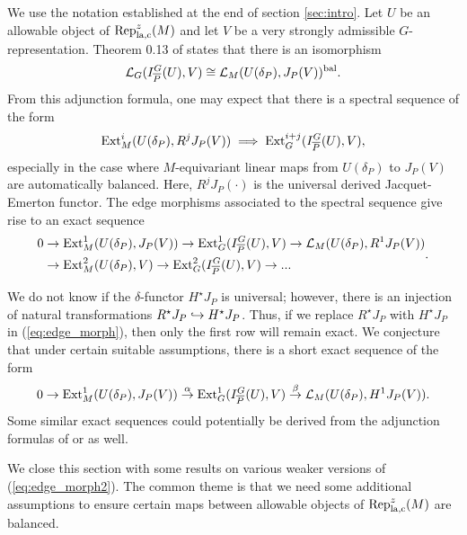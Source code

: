 \documentclass[10pt]{amsart}
\begin{document}
We use the notation established at the end of section \ref{sec:intro}. Let $U$ be an allowable object of $\textnormal{Rep}_{\text{la,c}}^{z}(M)$ and let $V$ be a very strongly admissible $G$-representation. Theorem 0.13 of \cite{Jacquet2} states that there is an isomorphism \begin{equation}\label{eq:Em_adjunction}
    \mathcal{L}_{G}(I_{\overline{P}}^{G}(U),V)\cong \mathcal{L}_{M}(U(\delta_{P}),J_{P}(V))^{\textnormal{bal}}.
\end{equation} From this adjunction formula, one may expect that there is a spectral sequence of the form \[
    \textnormal{Ext}^{i}_{M}(U(\delta_{P}),R^{j}J_{P}(V)) \implies \textnormal{Ext}^{i+j}_{G}(I_{\overline{P}}^{G}(U),V),
\] especially in the case where $M$-equivariant linear maps from $U(\delta_{P})$ to $J_{P}(V)$ are automatically balanced. Here, $R^{j}J_{P}(\cdot)$ is the universal derived Jacquet-Emerton functor. The edge morphisms associated to the spectral sequence give rise to an exact sequence \begin{align}\begin{split}\label{eq:edge_morph}
0 & \rightarrow \textnormal{Ext}^{1}_{M}(U(\delta_{P}),J_{P}(V)) \rightarrow \textnormal{Ext}^{1}_{G}(I_{\overline{P}}^{G}(U),V) \rightarrow \mathcal{L}_{M}(U(\delta_{P}),R^{1}J_{P}(V)) \\
& \rightarrow \textnormal{Ext}^{2}_{M}(U(\delta_{P}),V) \rightarrow \textnormal{Ext}^{2}_{G}(I_{\overline{P}}^{G}(U),V) \rightarrow ...
\end{split}.\end{align} 

We do not know if the $\delta$-functor $H^{\star}J_P$ is universal; however, there is an injection of natural transformations $R^{\star}J_P\hookrightarrow H^\star J_{P}$. Thus, if we replace $R^\star J_P$ with $H^\star J_P$ in (\ref{eq:edge_morph}), then only the first row will remain exact. We conjecture that under certain suitable assumptions, there is a short exact sequence of the form \begin{align}\label{eq:edge_morph2}
0 \rightarrow \textnormal{Ext}^{1}_{M}(U(\delta_{P}),J_{P}(V)) \overset{\alpha}{\rightarrow} \textnormal{Ext}^{1}_{G}(I_{\overline{P}}^{G}(U),V) \overset{\beta}{\rightarrow} \mathcal{L}_{M}(U(\delta_{P}),H^{1}J_{P}(V)).
\end{align} Some similar exact sequences could potentially be derived from the adjunction formulas of \cite[Rem. 4.4]{Breuil_socle2} or \cite[Thm. A, Thm. B]{Bergall_Chojecki} as well.

We close this section with some results on various weaker versions of (\ref{eq:edge_morph2}). The common theme is that we need some additional assumptions to ensure certain maps between allowable objects of $\textnormal{Rep}_{\text{la,c}}^{z}(M)$ are balanced. 
\end{document}
